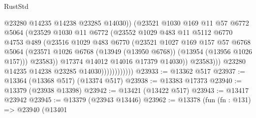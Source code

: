 \begin{lexlean}{RustStd}
\begin{coremodule}
                                    @23280
                                    @14235
                                    @14238
                                    @23285
                                    @14030))
                                (@23521
                                  @1030
                                  @169
                                  @11
                                  @57
                                  @6772
                                  @5064
                                  (@23529
                                    @1030
                                    @11
                                    @6772
                                    (@23552
                                      @1029
                                      @483
                                      @11
                                      @5112
                                      @6770
                                      @4753
                                      @489
                                      (@23516
                                        @1029
                                        @483
                                        @6770
                                        (@23521
                                          @1027
                                          @169
                                          @157
                                          @57
                                          @6768
                                          @5064
                                          (@23571
                                            @1026
                                            @6768
                                            (@13949 (@13950 @6768))
                                            (@13954 (@13956 @1026 @157)))
                                          @23583))
                                      @17374
                                      @14012
                                      @14016
                                      @17379
                                      @14030))
                                  @23583)))
                            @23280
                            @14235
                            @14238
                            @23285
                            @14030))))))))))))
@23933 := @13362 @517
@23937 := @13364 (@13368 @517) (@13374 @517)
@23938 := @13383 @17373
@23940 := @13379 (@23938 @13398)
@23942 := @13421 (@13422 @517)
@23943 := @13417 @23942
@23945 := @13379 (@23943 @13446)
@23962 := @13378
    (fun (fn : @131) =>
    @23940
      (@13401

\end{coremodule}
\end{lexlean}
